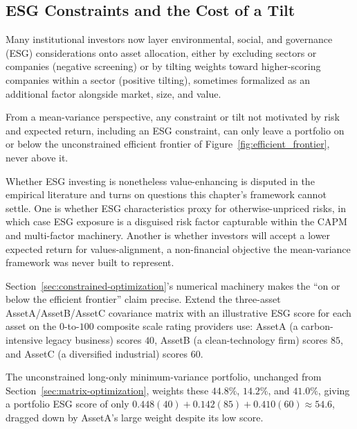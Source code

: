 \documentclass[../ai_in_finance]{subfiles}
\begin{document}
\subsection{ESG Constraints and the Cost of a Tilt}
\label{sec:esg-tilt}

Many institutional investors now layer environmental, social, and governance (ESG) considerations onto asset allocation, either by excluding sectors or companies (negative screening) or by tilting weights toward higher-scoring companies within a sector (positive tilting), sometimes formalized as an additional factor alongside market, size, and value.

From a mean-variance perspective, any constraint or tilt not motivated by risk and expected return, including an ESG constraint, can only leave a portfolio on or below the unconstrained efficient frontier of Figure~\ref{fig:efficient_frontier}, never above it.

Whether ESG investing is nonetheless value-enhancing is disputed in the empirical literature and turns on questions this chapter's framework cannot settle. One is whether ESG characteristics proxy for otherwise-unpriced risks, in which case ESG exposure is a disguised risk factor capturable within the CAPM and multi-factor machinery. Another is whether investors will accept a lower expected return for values-alignment, a non-financial objective the mean-variance framework was never built to represent.

\label{sec:esg-tilt-example}

Section~\ref{sec:constrained-optimization}'s numerical machinery makes the ``on or below the efficient frontier'' claim precise. Extend the three-asset AssetA/AssetB/AssetC covariance matrix with an illustrative ESG score for each asset on the $0$-to-$100$ composite scale rating providers use: AssetA (a carbon-intensive legacy business) scores $40$, AssetB (a clean-technology firm) scores $85$, and AssetC (a diversified industrial) scores $60$.

The unconstrained long-only minimum-variance portfolio, unchanged from Section~\ref{sec:matrix-optimization}, weights these $44.8\%$, $14.2\%$, and $41.0\%$, giving a portfolio ESG score of only $0.448(40) + 0.142(85) + 0.410(60) \approx 54.6$, dragged down by AssetA's large weight despite its low score.
\end{document}
